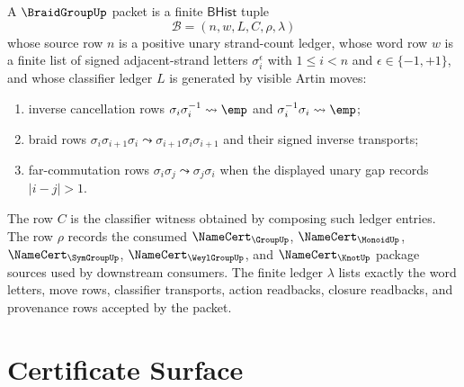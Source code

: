 \begin{definition}
\label{def:braidgroup-word-carrier}
A $\BraidGroupUp$ packet is a finite $\mathsf{BHist}$ tuple
$$
\mathcal{B}=(n,w,L,C,\rho,\lambda)
$$
whose source row $n$ is a positive unary strand-count ledger, whose word row $w$ is a finite list of signed adjacent-strand letters $\sigma_i^{\epsilon}$ with $1\leq i<n$ and $\epsilon\in\{-1,+1\}$, and whose classifier ledger $L$ is generated by visible Artin moves:
\begin{enumerate}
  \item inverse cancellation rows $\sigma_i\sigma_i^{-1}\leadsto \emp$ and $\sigma_i^{-1}\sigma_i\leadsto \emp$;
  \item braid rows $\sigma_i\sigma_{i+1}\sigma_i\leadsto\sigma_{i+1}\sigma_i\sigma_{i+1}$ and their signed inverse transports;
  \item far-commutation rows $\sigma_i\sigma_j\leadsto\sigma_j\sigma_i$ when the displayed unary gap records $|i-j|>1$.
\end{enumerate}
The row $C$ is the classifier witness obtained by composing such ledger entries. The row $\rho$ records the consumed $\NameCert_{\GroupUp}$, $\NameCert_{\MonoidUp}$, $\NameCert_{\SymGroupUp}$, $\NameCert_{\WeylGroupUp}$, and $\NameCert_{\KnotUp}$ package sources used by downstream consumers. The finite ledger $\lambda$ lists exactly the word letters, move rows, classifier transports, action readbacks, closure readbacks, and provenance rows accepted by the packet.
\end{definition}

\section{Certificate Surface}
\label{sec:braidgroup-certificate-surface}

